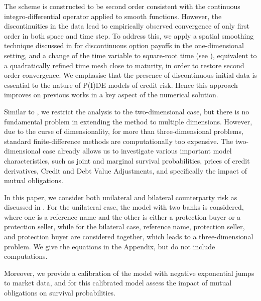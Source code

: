 The scheme is constructed to be second order consistent with the continuous integro-differential operator applied to smooth functions. However, the discontinuities in the data lead to empirically observed convergence of only first order in both space and time step.
To address this, we apply a spatial smoothing technique discussed in  \cite{pooley2003} for discontinuous option payoffs in the one-dimensional setting, and a change of the time variable to square-root time (see \cite{reisinger2013}), equivalent to a quadratically refined time mesh close to maturity, in order to restore second order convergence.
We emphasise that the presence of %
discontinuous initial data is essential to the nature of P(I)DE models of credit risk. Hence this approach improves on previous works in a key aspect of the numerical solution.

Similar to \cite{LiptonItkin2015}, we restrict the analysis to the two-dimensional case, but there is no fundamental problem in extending the method to multiple dimensions. However, due to the curse of dimensionality, for more than three-dimensional problems, standard finite-difference methods are computationally too expensive. The two-dimensional case already allows us to investigate various important model characteristics, such as joint and marginal survival probabilities, prices of credit derivatives, Credit and Debt Value Adjustments, and specifically the impact of mutual obligations.

In this paper, we consider both unilateral and bilateral counterparty risk as discussed in \cite{LiptonSav}. For the unilateral case, the model with two banks is considered, where one is a reference name and the other is either a protection buyer or a protection seller, while for the bilateral case, reference name, protection seller, and protection buyer are considered together, which leads to a three-dimensional problem. We give the equations in the Appendix, but do not include computations.

Moreover, we provide a calibration of the model with negative exponential jumps to market data, and for this calibrated model assess the impact of mutual obligations on survival probabilities.

